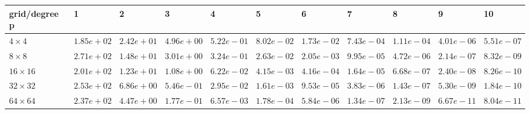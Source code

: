 \begin{tabular}{lllllllllll}
\hline
 grid/degree p   & 1          & 2          & 3          & 4          & 5          & 6          & 7          & 8          & 9          & 10         \\
\hline
 $4 \times 4$    & $1.85e+02$ & $2.42e+01$ & $4.96e+00$ & $5.22e-01$ & $8.02e-02$ & $1.73e-02$ & $7.43e-04$ & $1.11e-04$ & $4.01e-06$ & $5.51e-07$ \\
 $8 \times 8$    & $2.71e+02$ & $1.48e+01$ & $3.01e+00$ & $3.24e-01$ & $2.63e-02$ & $2.05e-03$ & $9.95e-05$ & $4.72e-06$ & $2.14e-07$ & $8.32e-09$ \\
 $16 \times 16$  & $2.01e+02$ & $1.23e+01$ & $1.08e+00$ & $6.22e-02$ & $4.15e-03$ & $4.16e-04$ & $1.64e-05$ & $6.68e-07$ & $2.40e-08$ & $8.26e-10$ \\
 $32 \times 32$  & $2.53e+02$ & $6.86e+00$ & $5.46e-01$ & $2.95e-02$ & $1.61e-03$ & $9.53e-05$ & $3.83e-06$ & $1.43e-07$ & $5.30e-09$ & $1.84e-10$ \\
 $64 \times 64$  & $2.37e+02$ & $4.47e+00$ & $1.77e-01$ & $6.57e-03$ & $1.78e-04$ & $5.84e-06$ & $1.34e-07$ & $2.13e-09$ & $6.67e-11$ & $8.04e-11$ \\
\hline
\end{tabular}